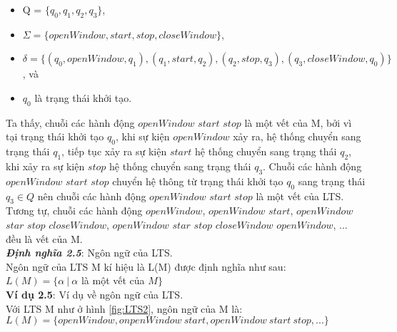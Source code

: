 \documentclass[a4paper,13pt,oneside,openany]{book}
\begin{document}
\begin{flushleft}
\begin{itemize}
			\item Q = $\{q_0, q_1, q_2, q_3\}$,
			\item $\Sigma = \{openWindow, start, stop, closeWindow\}$,
			\item $\delta = \{(q_0, openWindow, q_1), (q_1, start, q_2), (q_2, stop, q_3), (q_3, closeWindow, q_0)\}$, và
			\item $q_0$ là trạng thái khởi tạo.
		\end{itemize}
		Ta thấy, chuỗi các hành động $openWindow$ $start$ $stop$ là một vết của M, bởi vì tại trạng thái khởi tạo $q_0$, khi sự kiện $openWindow$ xảy ra, hệ thống chuyển sang trạng thái $q_1$, tiếp tục xảy ra sự kiện $start$ hệ thống chuyển sang trạng thái $q_2$, khi xảy ra sự kiện $stop$ hệ thống chuyển sang trạng thái $q_3$. Chuỗi các hành động $openWindow$ $start$ $stop$ chuyển hệ thông từ trạng thái khởi tạo $q_0$ sang trạng thái $q_3 \in Q$ nên chuỗi các hành động  $openWindow$ $start$ $stop$ là một vết của LTS. Tương tự, chuỗi các hành động $openWindow$, $openWindow$ $start$, $openWindow$ $star$ $stop$ $closeWindow$, $openWindow$ $star$ $stop$ $closeWindow$ $openWindow$, ... đều là vết của M.\\
		\textbf{\textit{Định nghĩa 2.5}}: Ngôn ngữ của LTS.\\
		Ngôn ngữ của LTS M kí hiệu là L(M) được định nghĩa như sau:\\
		$L(M) = \{\alpha \ | \ \alpha$ là một vết của $M\}$\\
		\textbf{Ví dụ 2.5}: Ví dụ về ngôn ngữ của LTS.\\
		Với LTS M như ở hình \ref{fig:LTS2}, ngôn ngữ của M là:\\
		$L(M) = \{openWindow, onpenWindow\ start, openWindow \ start \ stop, ...\}$
		

\end{flushleft}
\end{document}
